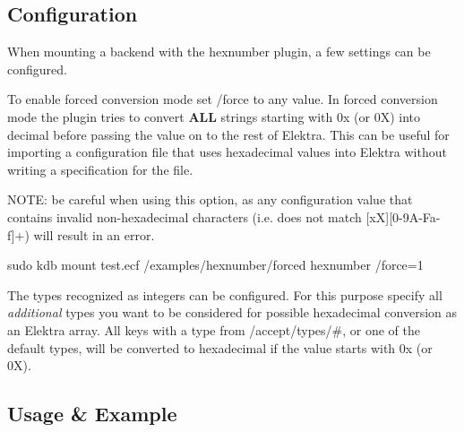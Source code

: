 \subsection*{Configuration}

When mounting a backend with the hexnumber plugin, a few settings can be configured.


\begin{DoxyEnumerate}
\item To enable forced conversion mode set {\ttfamily /force} to any value. In forced conversion mode the plugin tries to convert {\bfseries A\+LL} strings starting with {\ttfamily 0x} (or {\ttfamily 0X}) into decimal before passing the value on to the rest of Elektra. This can be useful for importing a configuration file that uses hexadecimal values into Elektra without writing a specification for the file.

N\+O\+TE\+: be careful when using this option, as any configuration value that contains invalid non-\/hexadecimal characters (i.\+e. does not match {\mbox{[}xX\mbox{]}\mbox{[}0-\/9\+A-\/\+Fa-\/f\mbox{]}+}) will result in an error.
\end{DoxyEnumerate}


\begin{DoxyCode}
sudo kdb mount test.ecf /examples/hexnumber/forced hexnumber /force=1
\end{DoxyCode}



\begin{DoxyEnumerate}
\item The types recognized as integers can be configured. For this purpose specify all {\itshape additional} types you want to be considered for possible hexadecimal conversion as an Elektra array. All keys with a type from {\ttfamily /accept/types/\#}, or one of the default types, will be converted to hexadecimal if the value starts with {\ttfamily 0x} (or {\ttfamily 0X}).
\end{DoxyEnumerate}




\subsection*{Usage \& Example}



